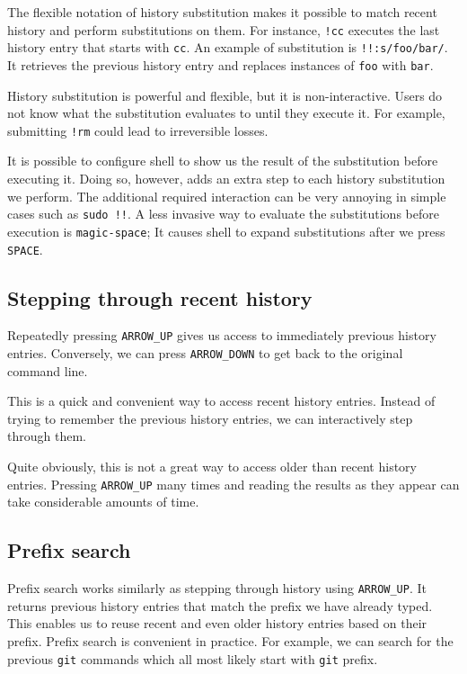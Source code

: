 The flexible notation of history substitution makes it possible to match recent history and perform substitutions on them. For instance, \verb|!cc| executes the last history entry that starts with \verb|cc|. An example of substitution is \verb|!!:s/foo/bar/|. It retrieves the previous history entry and replaces instances of \verb|foo| with \verb|bar|.

History substitution is powerful and flexible, but it is non-interactive. Users do not know what the substitution evaluates to until they execute it. For example, submitting \verb|!rm| could lead to irreversible losses.

It is possible to configure shell to show us the result of the substitution before executing it. Doing so, however, adds an extra step to each history substitution we perform. The additional required interaction can be very annoying in simple cases such as \verb|sudo !!|. A less invasive way to evaluate the substitutions before execution is \verb|magic-space|; It causes shell to expand substitutions after we press \verb|SPACE|.

\subsection{Stepping through recent history}

Repeatedly pressing \verb|ARROW_UP| gives us access to immediately previous history entries. Conversely, we can press \verb|ARROW_DOWN| to get back to the original command line. 

This is a quick and convenient way to access recent history entries. Instead of trying to remember the previous history entries, we can interactively step through them.

Quite obviously, this is not a great way to access older than recent history entries. Pressing \verb|ARROW_UP| many times and reading the results as they appear can take considerable amounts of time.

\subsection{Prefix search}

Prefix search works similarly as stepping through history using \verb|ARROW_UP|. It returns previous history entries that match the prefix we have already typed. 
This enables us to reuse recent and even older history entries based on their prefix. Prefix search is convenient in practice. For example, we can search for the previous \verb|git| commands which all most likely start with \verb|git| prefix.

